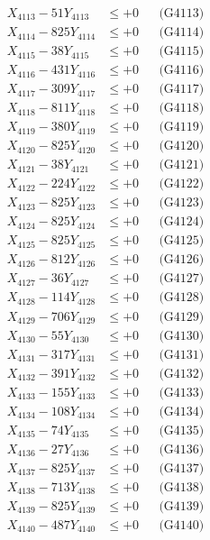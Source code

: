 \documentclass[a4paper,10pt]{article}
\begin{document}
{\begin{align}
X_{4113} - 51Y_{4113} &\leq +0 && \text{(G4113)} \\
X_{4114} - 825Y_{4114} &\leq +0 && \text{(G4114)} \\
X_{4115} - 38Y_{4115} &\leq +0 && \text{(G4115)} \\
X_{4116} - 431Y_{4116} &\leq +0 && \text{(G4116)} \\
X_{4117} - 309Y_{4117} &\leq +0 && \text{(G4117)} \\
X_{4118} - 811Y_{4118} &\leq +0 && \text{(G4118)} \\
X_{4119} - 380Y_{4119} &\leq +0 && \text{(G4119)} \\
X_{4120} - 825Y_{4120} &\leq +0 && \text{(G4120)} \\
\allowbreak
X_{4121} - 38Y_{4121} &\leq +0 && \text{(G4121)} \\
X_{4122} - 224Y_{4122} &\leq +0 && \text{(G4122)} \\
X_{4123} - 825Y_{4123} &\leq +0 && \text{(G4123)} \\
X_{4124} - 825Y_{4124} &\leq +0 && \text{(G4124)} \\
X_{4125} - 825Y_{4125} &\leq +0 && \text{(G4125)} \\
X_{4126} - 812Y_{4126} &\leq +0 && \text{(G4126)} \\
X_{4127} - 36Y_{4127} &\leq +0 && \text{(G4127)} \\
X_{4128} - 114Y_{4128} &\leq +0 && \text{(G4128)} \\
X_{4129} - 706Y_{4129} &\leq +0 && \text{(G4129)} \\
X_{4130} - 55Y_{4130} &\leq +0 && \text{(G4130)} \\
\allowbreak
X_{4131} - 317Y_{4131} &\leq +0 && \text{(G4131)} \\
X_{4132} - 391Y_{4132} &\leq +0 && \text{(G4132)} \\
X_{4133} - 155Y_{4133} &\leq +0 && \text{(G4133)} \\
X_{4134} - 108Y_{4134} &\leq +0 && \text{(G4134)} \\
X_{4135} - 74Y_{4135} &\leq +0 && \text{(G4135)} \\
X_{4136} - 27Y_{4136} &\leq +0 && \text{(G4136)} \\
X_{4137} - 825Y_{4137} &\leq +0 && \text{(G4137)} \\
X_{4138} - 713Y_{4138} &\leq +0 && \text{(G4138)} \\
X_{4139} - 825Y_{4139} &\leq +0 && \text{(G4139)} \\
X_{4140} - 487Y_{4140} &\leq +0 && \text{(G4140)} \\

\end{align}}
\end{document}
